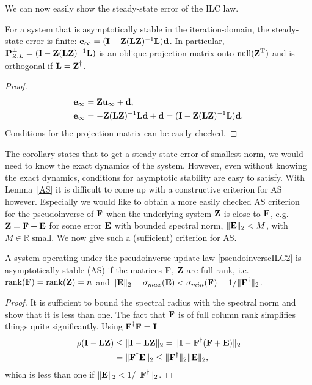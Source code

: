 %
We can now easily show the steady-state error of the ILC law.
%
\begin{cor}
For a system that is asymptotically stable in the iteration-domain, the steady-state error is finite: $\boldsymbol{\mathrm{e}}_{\infty} = (\boldsymbol{\mathrm{I}} - \boldsymbol{\mathrm{Z}}(\boldsymbol{\mathrm{L}}\boldsymbol{\mathrm{Z}})^{-1}\boldsymbol{\mathrm{L}})\boldsymbol{\mathrm{d}}$. In particular, $\boldsymbol{\mathrm{P}}_{Z,L}^{\perp} = (\boldsymbol{\mathrm{I}} - \boldsymbol{\mathrm{Z}}(\boldsymbol{\mathrm{L}}\boldsymbol{\mathrm{Z}})^{-1}\boldsymbol{\mathrm{L}})$ is an oblique projection matrix onto $\mathrm{null}(\boldsymbol{\mathrm{Z}}^{\mathrm{T}})$ and is orthogonal if $\boldsymbol{\mathrm{L}} = \boldsymbol{\mathrm{Z}}^{\dagger}$.
\end{cor}
%
\begin{proof}
%
\begin{align}
\boldsymbol{\mathrm{e}}_{\infty} &= \boldsymbol{\mathrm{Z}}\boldsymbol{\mathrm{u}}_{\infty} + \boldsymbol{\mathrm{d}}, \\
\boldsymbol{\mathrm{e}}_{\infty} &= -\boldsymbol{\mathrm{Z}}(\boldsymbol{\mathrm{L}}\boldsymbol{\mathrm{Z}})^{-1}\boldsymbol{\mathrm{L}}\boldsymbol{\mathrm{d}} + \boldsymbol{\mathrm{d}} = (\boldsymbol{\mathrm{I}} - \boldsymbol{\mathrm{Z}}(\boldsymbol{\mathrm{L}}\boldsymbol{\mathrm{Z}})^{-1}\boldsymbol{\mathrm{L}})\boldsymbol{\mathrm{d}}.
\end{align}
%
Conditions for the projection matrix can be easily checked.
\end{proof}
%
The corollary states that to get a steady-state error of smallest norm, we would need to know the exact dynamics of the system. However, even without knowing the exact dynamics, conditions for asymptotic stability are easy to satisfy. %
With Lemma~\ref{AS} it is difficult to come up with a constructive criterion for AS however. Especially we would like to obtain a more easily checked AS criterion for the pseudoinverse of $\boldsymbol{\mathrm{F}}$ when the underlying system $\boldsymbol{\mathrm{Z}}$ is close to $\boldsymbol{\mathrm{F}}$, e.g. $\boldsymbol{\mathrm{Z}} = \boldsymbol{\mathrm{F}} + \boldsymbol{\mathrm{E}}$ for some error $\boldsymbol{\mathrm{E}}$ with bounded spectral norm, $\|\boldsymbol{\mathrm{E}}\|_2 < M$, with $M \in \mathbb{R}$ small. We now give such a (sufficient) criterion for AS.
%
\begin{lem}
A system operating under the pseudoinverse update law \eqref{pseudoinverseILC2} is asymptotically stable (AS) if the matrices $\boldsymbol{\mathrm{F}}$, $\boldsymbol{\mathrm{Z}}$ are full rank, i.e. $\mathrm{rank}(\boldsymbol{\mathrm{F}}) = \mathrm{rank}(\boldsymbol{\mathrm{Z}}) = n$ and $\|\boldsymbol{\mathrm{E}}\|_2 = \sigma_{max}(\boldsymbol{\mathrm{E}}) < \sigma_{min}(\boldsymbol{\mathrm{F}}) = 1/\|\boldsymbol{\mathrm{F}}^{\dagger}\|_2$.
\end{lem}
%
\begin{proof}
It is sufficient to bound the spectral radius with the spectral norm and show that it is less than one. The fact that $\boldsymbol{\mathrm{F}}$ is of full column rank simplifies things quite significantly. Using $\boldsymbol{\mathrm{F}}^{\dagger}\boldsymbol{\mathrm{F}} = \boldsymbol{\mathrm{I}}$
%
\begin{align}
\rho(\boldsymbol{\mathrm{I}} - \boldsymbol{\mathrm{L}}\boldsymbol{\mathrm{Z}}) &\leq \|\boldsymbol{\mathrm{I}} - \boldsymbol{\mathrm{L}}\boldsymbol{\mathrm{Z}}\|_2 = \|\boldsymbol{\mathrm{I}} - \boldsymbol{\mathrm{F}}^{\dagger}(\boldsymbol{\mathrm{F}} + \boldsymbol{\mathrm{E}})\|_2 \\
&= \|\boldsymbol{\mathrm{F}}^{\dagger}\boldsymbol{\mathrm{E}}\|_2 \leq \|\boldsymbol{\mathrm{F}}^{\dagger}\|_2\|\boldsymbol{\mathrm{E}}\|_2,
\end{align}
%
which is less than one if $\|\boldsymbol{\mathrm{E}}\|_2 < 1/\|\boldsymbol{\mathrm{F}}^{\dagger}\|_2$.
\end{proof}
